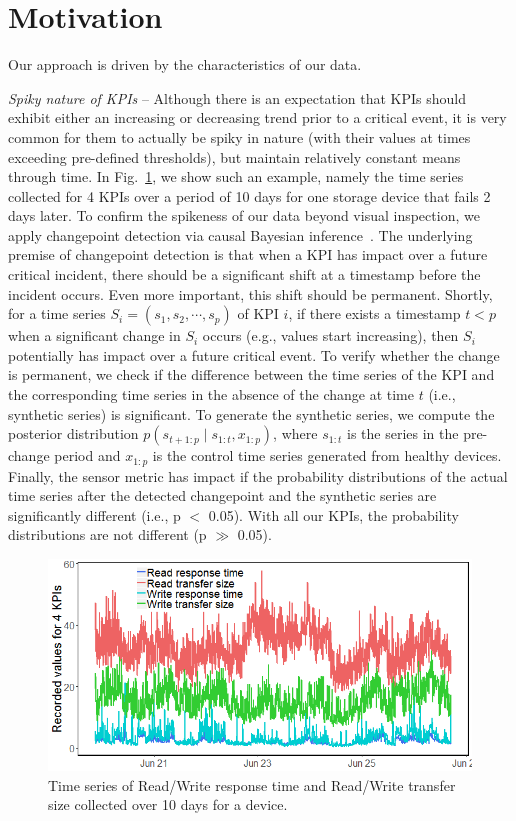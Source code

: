 \documentclass[letterpaper]{article} %
\begin{document}
\section{Motivation}

Our approach is driven by the characteristics of our data.

\textit{Spiky nature of KPIs} -- Although there is an expectation that KPIs should exhibit either an increasing or decreasing trend prior to a critical event, it is very common for them to actually be spiky in nature (with their values at times exceeding pre-defined thresholds), but maintain relatively constant means through time. In Fig.~\ref{fig:spiky}, we show such an example, namely the time series collected for 4 KPIs over a period of 10 days for one storage device that fails 2 days later. To confirm the spikeness of our data beyond visual inspection, we apply changepoint detection via causal Bayesian inference~\cite{changepoint}. The underlying premise of changepoint detection is that when a KPI has impact over a future critical incident, there should be a significant shift at a timestamp before the incident occurs. Even more important, this shift should be permanent. Shortly, for a time series $S_i=(s_1, s_2,\cdots,s_p)$ of KPI $i$, if there exists a timestamp $t<p$ when a significant change in $S_i$ occurs (e.g., values start increasing), then $S_i$ potentially has impact over a future critical event. To verify whether the change is permanent, we check if the difference between the time series of the KPI and the corresponding time series in the absence of the change at time $t$ (i.e., synthetic series) is significant. To generate the synthetic series, we compute the posterior distribution $p(s_{t+1:p} \mid s_{1:t}, x_{1:p})$, where $s_{1:t}$ is the series in the pre-change period and $x_{1:p}$ is the control time series generated from healthy devices. Finally, the sensor metric has impact if the probability distributions of the actual time series after the detected changepoint and the synthetic series are significantly different (i.e., p $<$ 0.05). With all our KPIs, the probability distributions are not different (p $\gg$ 0.05).


\begin{figure}
\includegraphics[width=\linewidth]{series2-small.png}
\caption{Time series of Read/Write response time and Read/Write transfer size collected over 10 days for a device. }
\label{fig:spiky}
\end{figure}
\end{document}
